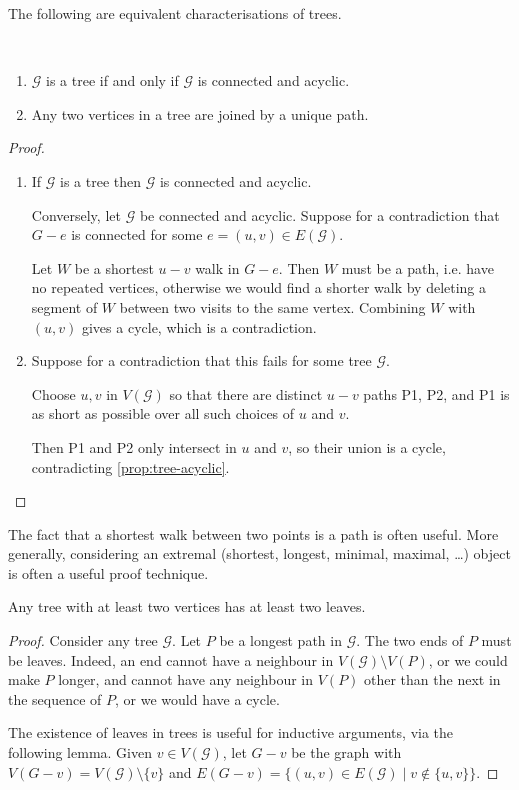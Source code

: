 The following are equivalent characterisations of trees.
\begin{lemma}\label{lemma:tree-char} \
\begin{enumerate}[label=(\roman*)]
\item $\mathcal{G}$ is a tree if and only if $\mathcal{G}$ is connected and acyclic.
\item Any two vertices in a tree are joined by a unique path.
\end{enumerate}
\end{lemma}

\begin{proof} \
\begin{enumerate}[label=(\roman*)]
\item If $\mathcal{G}$ is a tree then $\mathcal{G}$ is connected and acyclic.

Conversely, let $\mathcal{G}$ be connected and acyclic. Suppose for a contradiction that $G-e$ is connected for some $e = (u,v) \in E(\mathcal{G})$.

Let $W$ be a shortest $u-v$ walk in $G-e$. Then $W$ must be a path, i.e. have no repeated vertices, otherwise we would find a shorter walk by deleting a segment of $W$ between two visits to the same vertex. Combining $W$ with $(u,v)$ gives a cycle, which is a contradiction.

\item Suppose for a contradiction that this fails for some tree $\mathcal{G}$. 

Choose $u,v$ in $V(\mathcal{G})$ so that there are distinct $u-v$ paths P1, P2, and P1 is as short as possible over all such choices of $u$ and $v$.

Then P1 and P2 only intersect in $u$ and $v$, so their union is a cycle, contradicting \cref{prop:tree-acyclic}.
\end{enumerate}
\end{proof}

\begin{remark}
The fact that a shortest walk between two points is a path is often useful. More generally, considering an extremal (shortest, longest, minimal, maximal, \dots) object is often a useful proof technique.
\end{remark}

\begin{lemma}\label{tree_leaves}
Any tree with at least two vertices has at least two leaves.
\end{lemma}
\begin{proof}
Consider any tree $\mathcal{G}$. Let $P$ be a longest path in $\mathcal{G}$. The two ends of $P$ must be leaves. Indeed, an end cannot have a neighbour in $V(\mathcal{G}) \setminus V(P)$, or we could make $P$ longer, and cannot have any neighbour in $V(P)$ other than the next in the sequence of $P$, or we would have a cycle.

The existence of leaves in trees is useful for inductive arguments, via the following lemma. Given $v \in V(\mathcal{G})$, let $G-v$ be the graph with $V(G-v) = V(\mathcal{G})\setminus\{v\}$ and $E(G-v) = \{(u,v) \in E(\mathcal{G}) \mid v \notin \{u,v\}\}$.
\end{proof}

